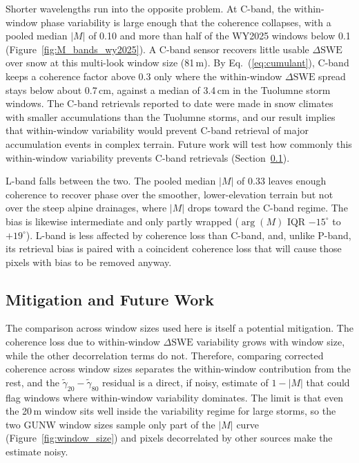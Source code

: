 \documentclass[tc, manuscript]{copernicus}
\begin{document}
Shorter wavelengths run into the opposite problem. At C-band, the within-window phase variability is large enough that the coherence collapses, with a pooled median $|M|$ of 0.10 and more than half of the WY2025 windows below 0.1 (Figure~\ref{fig:M_bands_wy2025}). A C-band sensor recovers little usable $\Delta\mathrm{SWE}$ over snow at this multi-look window size (81\,\unit{m}). By Eq.~(\ref{eq:cumulant}), C-band keeps a coherence factor above 0.3 only where the within-window $\Delta\mathrm{SWE}$ spread stays below about 0.7\,\unit{cm}, against a median of 3.4\,\unit{cm} in the Tuolumne storm windows. The C-band retrievals reported to date \citep{Oveisgharan2024, oveisgharan2025using-92d, bovenga2025multi-band-f90} were made in snow climates with smaller accumulations than the Tuolumne storms, and our result implies that within-window variability would prevent C-band retrieval of major accumulation events in complex terrain. Future work will test how commonly this within-window variability prevents C-band retrievals (Section~\ref{subsec:mitigation}).


L-band falls between the two. The pooled median $|M|$ of 0.33 leaves enough coherence to recover phase over the smoother, lower-elevation terrain but not over the steep alpine drainages, where $|M|$ drops toward the C-band regime. The bias is likewise intermediate and only partly wrapped ($\arg(M)$ IQR $-15^\circ$ to $+19^\circ$). L-band is less affected by coherence loss than C-band, and, unlike P-band, its retrieval bias is paired with a coincident coherence loss that will cause those pixels with bias to be removed anyway.

\subsection{Mitigation and Future Work}\label{subsec:mitigation}

The comparison across window sizes used here is itself a potential mitigation. The coherence loss due to within-window $\Delta\mathrm{SWE}$ variability grows with window size, while the other decorrelation terms do not. Therefore, comparing corrected coherence across window sizes separates the within-window contribution from the rest, and the $\tilde{\gamma}_{20}-\tilde{\gamma}_{80}$ residual is a direct, if noisy, estimate of $1-|M|$ that could flag windows where within-window variability dominates. The limit is that even the 20\,\unit{m} window sits well inside the variability regime for large storms, so the two GUNW window sizes sample only part of the $|M|$ curve (Figure~\ref{fig:window_size}) and pixels decorrelated by other sources make the estimate noisy.
\end{document}
